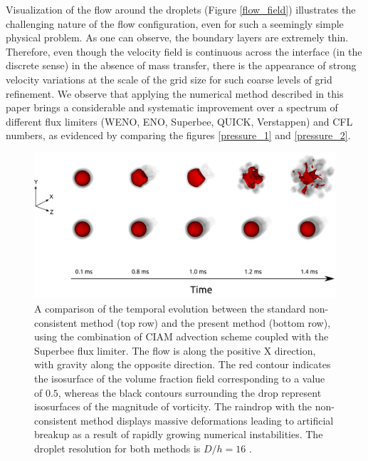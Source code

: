 Visualization of the flow around the droplets (Figure \ref{flow_field}) 
illustrates the challenging nature of the flow configuration, 
even for such a seemingly simple physical problem. 
As one can observe, the boundary layers are extremely thin. 
Therefore, even though the velocity field is continuous across the 
interface (in the discrete sense) in the absence of mass transfer, 
there is the appearance of strong velocity variations at the 
scale of the grid size for such coarse levels of grid refinement. 
We observe that applying the numerical method described in this 
paper brings a considerable and systematic improvement over a 
spectrum of different flux limiters (WENO, ENO, Superbee, QUICK, Verstappen) 
and CFL numbers, as evidenced by comparing the figures \ref{pressure_1} and \ref{pressure_2}. 

\begin{figure}
\begin{center}
\includegraphics[width=1.25\textwidth]{plots/raindrop/raindrop_explode.png}
\end{center}
\caption{A comparison of the temporal evolution between the standard 
non-consistent method (top row) and the present method (bottom row), 
using the combination of CIAM advection scheme coupled with the Superbee flux limiter. 
The flow is along the positive X direction, with gravity along the opposite direction. 
The red contour indicates the isosurface of the volume fraction 
field corresponding to a value of $0.5$, whereas the black contours 
surrounding the drop represent isosurfaces of the magnitude of vorticity. 
The raindrop with the non-consistent method displays massive deformations 
leading to artificial breakup as a result of rapidly growing numerical instabilities. 
The droplet resolution for both methods is $D/h = 16$ .}
\label{explode_compare}
\end{figure}


